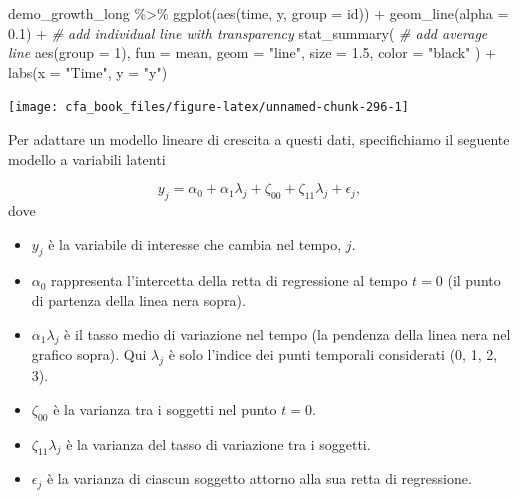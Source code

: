 \documentclass[
  11pt,
]{krantz}
\makeatletter
\newenvironment{Shaded}{\begin{snugshade}}{\end{snugshade}}
\newcommand{\AttributeTok}[1]{\textcolor[rgb]{0.61,0.61,0.61}{#1}}
\newcommand{\CommentTok}[1]{\textcolor[rgb]{0.37,0.37,0.37}{\textit{#1}}}
\newcommand{\DecValTok}[1]{\textcolor[rgb]{0.06,0.06,0.06}{#1}}
\newcommand{\FloatTok}[1]{\textcolor[rgb]{0.06,0.06,0.06}{#1}}
\newcommand{\FunctionTok}[1]{\textcolor[rgb]{0,0,0}{#1}}
\newcommand{\NormalTok}[1]{#1}
\newcommand{\SpecialCharTok}[1]{\textcolor[rgb]{0,0,0}{#1}}
\newcommand{\StringTok}[1]{\textcolor[rgb]{0.5,0.5,0.5}{#1}}
\providecommand{\tightlist}{%
  \setlength{\itemsep}{0pt}\setlength{\parskip}{0pt}}
\newenvironment{kframe}{%
\medskip{}
\setlength{\fboxsep}{.8em}
 \def\at@end@of@kframe{}%
 \ifinner\ifhmode%
  \def\at@end@of@kframe{\end{minipage}}%
  \begin{minipage}{\columnwidth}%
 \fi\fi%
 \def\FrameCommand##1{\hskip\@totalleftmargin \hskip-\fboxsep
 \colorbox{shadecolor}{##1}\hskip-\fboxsep
     \hskip-\linewidth \hskip-\@totalleftmargin \hskip\columnwidth}%
 \MakeFramed {\advance\hsize-\width
   \@totalleftmargin\z@ \linewidth\hsize
   \@setminipage}}%
 {\par\unskip\endMakeFramed%
 \at@end@of@kframe}
\renewenvironment{Shaded}{\begin{kframe}}{\end{kframe}}
\theoremstyle{definition}
\theoremstyle{definition}
\theoremstyle{definition}
\theoremstyle{definition}
\theoremstyle{remark}
\makeatother
\begin{document}
\begin{Shaded}
\begin{Highlighting}[]
\NormalTok{demo\_growth\_long }\SpecialCharTok{\%\textgreater{}\%}
  \FunctionTok{ggplot}\NormalTok{(}\FunctionTok{aes}\NormalTok{(time, y, }\AttributeTok{group =}\NormalTok{ id)) }\SpecialCharTok{+}
  \FunctionTok{geom\_line}\NormalTok{(}\AttributeTok{alpha =} \FloatTok{0.1}\NormalTok{) }\SpecialCharTok{+} \CommentTok{\# add individual line with transparency}
  \FunctionTok{stat\_summary}\NormalTok{( }\CommentTok{\# add average line}
    \FunctionTok{aes}\NormalTok{(}\AttributeTok{group =} \DecValTok{1}\NormalTok{),}
    \AttributeTok{fun =}\NormalTok{ mean,}
    \AttributeTok{geom =} \StringTok{"line"}\NormalTok{,}
    \AttributeTok{size =} \FloatTok{1.5}\NormalTok{,}
    \AttributeTok{color =} \StringTok{"black"}
\NormalTok{  ) }\SpecialCharTok{+}
  \FunctionTok{labs}\NormalTok{(}\AttributeTok{x =} \StringTok{"Time"}\NormalTok{, }\AttributeTok{y =} \StringTok{"y"}\NormalTok{)}
\end{Highlighting}
\end{Shaded}

\begin{center}\texttt{[image: cfa\_book\_files/figure-latex/unnamed-chunk-296-1]} \end{center}

Per adattare un modello lineare di crescita a questi dati, specifichiamo il seguente modello a variabili latenti

\[
y_j = \alpha_0 + \alpha_1 \lambda_j + \zeta_{00} + \zeta_{11} \lambda_j + \epsilon_j,
\] dove

\begin{itemize}
\tightlist
\item
  \(y_j\) è la variabile di interesse che cambia nel tempo, \(j\).
\item
  \(\alpha_0\) rappresenta l'intercetta della retta di regressione al tempo \(t = 0\) (il punto di partenza della linea nera sopra).
\item
  \(\alpha_1 \lambda_j\) è il tasso medio di variazione nel tempo (la pendenza della linea nera nel grafico sopra). Qui \(\lambda_j\) è solo l'indice dei punti temporali considerati (0, 1, 2, 3).
\item
  \(\zeta_{00}\) è la varianza tra i soggetti nel punto \(t = 0\).
\item
  \(\zeta_{11} \lambda_j\) è la varianza del tasso di variazione tra i soggetti.
\item
  \(\epsilon_j\) è la varianza di ciascun soggetto attorno alla sua retta di regressione.
\end{itemize}
\end{document}
